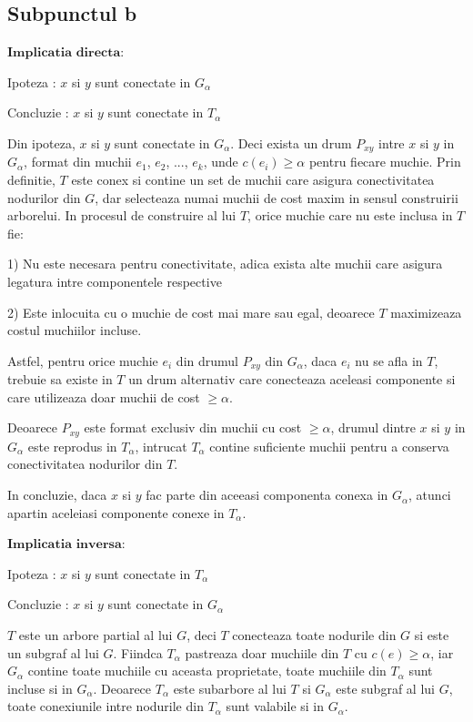 \documentclass{article}
\begin{document}
\subsection*{\fontsize{16}{30}\selectfont Subpunctul b}
{\fontsize{14}{16}\selectfont 
$\mathbf{Implicatia}$ $\mathbf{directa:}$ 
\\
\par Ipoteza : $x$ si $y$ sunt conectate in $G_\alpha$
\par Concluzie : $x$ si $y$ sunt conectate in $T_\alpha$         
\\
\par Din ipoteza, $x$ si $y$ sunt conectate in $G_\alpha$. Deci exista un drum $P_{xy}$ intre $x$ si $y$ in $G_\alpha$, format din muchii $e_1$, $e_2$, ..., $e_k$, unde $c(e_i) \geq \alpha$ pentru fiecare muchie.
Prin definitie, $T$ este conex si contine un set de muchii care asigura conectivitatea nodurilor din $G$, dar selecteaza numai muchii de cost maxim in sensul construirii arborelui. In procesul de construire al lui $T$, orice muchie care nu este inclusa in $T$ fie:
\par 1) Nu este necesara pentru conectivitate, adica exista alte muchii care asigura legatura intre componentele respective
\par 2) Este inlocuita cu o muchie de cost mai mare sau egal, deoarece $T$ maximizeaza costul muchiilor incluse. 
\par Astfel, pentru orice muchie $e_i$ din drumul $P_{xy}$ din $G_\alpha$, daca $e_i$ nu se afla in $T$, trebuie sa existe in $T$ un drum alternativ care conecteaza aceleasi componente si care utilizeaza doar muchii de cost $\geq \alpha$.
\par Deoarece $P_{xy}$ este format exclusiv din muchii cu cost $\geq \alpha$, drumul dintre $x$ si $y$ in $G_\alpha$ este reprodus in $T_\alpha$, intrucat $T_\alpha$ contine suficiente muchii pentru a conserva conectivitatea nodurilor din $T$. 
\par In concluzie, daca $x$ si $y$ fac parte din aceeasi componenta conexa in $G_\alpha$, atunci apartin aceleiasi componente conexe in $T_\alpha$.    
\\
\par $\mathbf{Implicatia}$ $\mathbf{inversa:}$
\\
\par Ipoteza : $x$ si $y$ sunt conectate in $T_\alpha$
\par Concluzie : $x$ si $y$ sunt conectate in $G_\alpha$
\\
\par $T$ este un arbore partial al lui $G$, deci $T$ conecteaza toate nodurile din $G$ si este un subgraf al lui $G$. Fiindca $T_\alpha$ pastreaza doar muchiile din $T$ cu $c(e)\geq \alpha$, iar $G_\alpha$ contine toate muchiile cu aceasta proprietate, toate muchiile din $T_\alpha$ sunt incluse si in $G_\alpha$. Deoarece $T_\alpha$ este subarbore al lui $T$ si $G_\alpha$ este subgraf al lui $G$, toate conexiunile intre nodurile din $T_\alpha$ sunt valabile si in $G_\alpha$.
\\
}    
\end{document}
